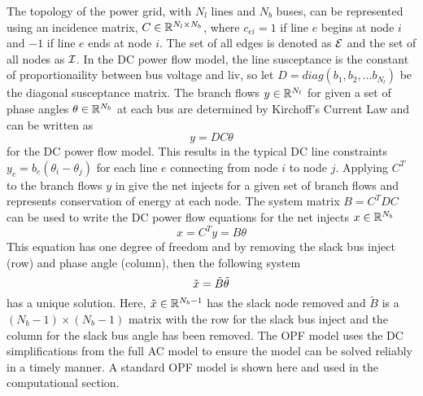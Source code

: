 The topology of the power grid, with $N_l$ lines and $N_b$ buses, can be represented using an incidence matrix, $C \in \mathbb{R}^{N_l \times N_b}$, where $c_{ei}=1$ if line $e$ begins at node $i$ and $-1$ if line $e$ ends at node $i$.  The set of all edges is denoted as $\mathcal{E}$ and the set of all nodes as $\mathcal{I}$.  In the DC power flow model, the line susceptance is the constant of proportionaility between bus voltage and liv, so let $D=diag\left(b_1,b_2,...b_{N_l}\right)$ be the diagonal susceptance matrix.  The branch flows $y \in \mathbb{R}^{N_l}$ for given a set of phase angles $\theta \in \mathbb{R}^{N_b}$ at each bus are determined by Kirchoff's Current Law and can be written as
\begin{equation}\label{kcl}
y=D C \theta
\end{equation}
for the DC power flow model.  This results in the typical DC line constraints $y_{e} = b_{e} (\theta_i - \theta_j)$ for each line $e$ connecting from node $i$ to node $j$.  Applying $C^T$ to the branch flows $y$ in  give the net injects for a given set of branch flows and represents conservation of energy at each node.
  The system matrix $B = C^T D C$ can be used to write the DC power flow equations for the net injects $x \in \mathbb{R}^{N_b}$
\begin{equation}\label{dcpow}
x = C^T y = B \theta
\end{equation}
This equation has one degree of freedom and by removing the slack bus inject (row) and phase angle (column), then the following system
\begin{equation}
\tilde{x} = \tilde{B} \tilde{\theta}
\end{equation}
has a unique solution.   Here, $\tilde{x} \in \mathbb{R}^{N_b-1}$ has the slack node removed and $\tilde{B}$ is a $(N_b-1) \times (N_b-1)$ matrix with the row for the slack bus inject and the column for the slack bus angle has been removed.  The OPF model uses the DC simplifications from the full AC model to ensure the model can be solved reliably in a timely manner.  A standard OPF model is shown here and used in the computational section.

